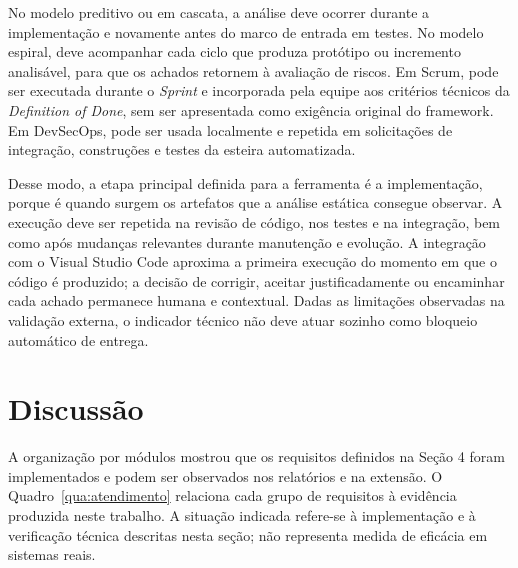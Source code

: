 \documentclass[12pt,a4paper,oneside]{report}
\begin{document}
No modelo preditivo ou em cascata, a análise deve ocorrer durante a implementação e novamente antes do marco de entrada em testes. No modelo espiral, deve acompanhar cada ciclo que produza protótipo ou incremento analisável, para que os achados retornem à avaliação de riscos. Em Scrum, pode ser executada durante o \textit{Sprint} e incorporada pela equipe aos critérios técnicos da \textit{Definition of Done}, sem ser apresentada como exigência original do framework. Em DevSecOps, pode ser usada localmente e repetida em solicitações de integração, construções e testes da esteira automatizada.

Desse modo, a etapa principal definida para a ferramenta é a implementação, porque é quando surgem os artefatos que a análise estática consegue observar. A execução deve ser repetida na revisão de código, nos testes e na integração, bem como após mudanças relevantes durante manutenção e evolução. A integração com o Visual Studio Code aproxima a primeira execução do momento em que o código é produzido; a decisão de corrigir, aceitar justificadamente ou encaminhar cada achado permanece humana e contextual. Dadas as limitações observadas na validação externa, o indicador técnico não deve atuar sozinho como bloqueio automático de entrega.

\section{Discussão}

A organização por módulos mostrou que os requisitos definidos na Seção 4 foram implementados e podem ser observados nos relatórios e na extensão. O Quadro~\ref{qua:atendimento} relaciona cada grupo de requisitos à evidência produzida neste trabalho. A situação indicada refere-se à implementação e à verificação técnica descritas nesta seção; não representa medida de eficácia em sistemas reais.
\end{document}
